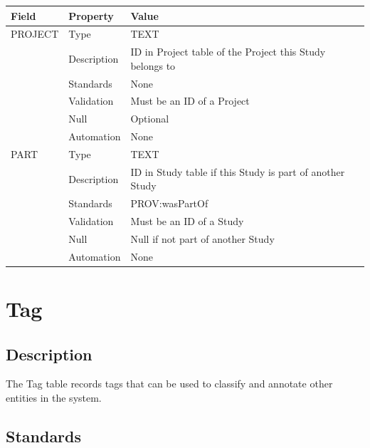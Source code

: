 \begin{longtable}[]{@{}
  >{\raggedright\arraybackslash}p{}
  >{\raggedright\arraybackslash}p{}
  >{\raggedright\arraybackslash}p{}@{}}
\toprule\noalign{}
\begin{minipage}[b]{\linewidth}\raggedright
Field
\end{minipage} & \begin{minipage}[b]{\linewidth}\raggedright
Property
\end{minipage} & \begin{minipage}[b]{\linewidth}\raggedright
Value
\end{minipage} \\
\midrule\noalign{}
\endhead
\bottomrule\noalign{}
\endlastfoot
PROJECT & Type & TEXT \\
& Description & ID in Project table of the Project this Study belongs
to \\
& Standards & None \\
& Validation & Must be an ID of a Project \\
& Null & Optional \\
& Automation & None \\
PART & Type & TEXT \\
& Description & ID in Study table if this Study is part of another
Study \\
& Standards & PROV:wasPartOf \\
& Validation & Must be an ID of a Study \\
& Null & Null if not part of another Study \\
& Automation & None \\
\end{longtable}

\section{Tag}\label{tag}

\subsection{Description}\label{description-33}

The Tag table records tags that can be used to classify and annotate
other entities in the system.

\subsection{Standards}\label{standards-35}

